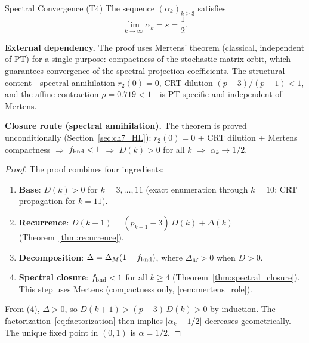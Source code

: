 \documentclass[12pt,a4paper]{article}
\begin{document}
\begin{thmbox}{Spectral Convergence (T4)}
\label{thm:T4}
The sequence $(\alpha_k)_{k \geq 3}$ satisfies
\begin{equation}
  \lim_{k \to \infty} \alpha_k = s = \frac{1}{2}.
  \label{eq:T4}
\end{equation}

\textbf{External dependency.}
The proof uses Mertens' theorem (classical, independent of PT)
for a single purpose: compactness of the stochastic matrix orbit,
which guarantees convergence of the spectral projection coefficients.
The structural content---spectral annihilation $r_2(0) = 0$,
CRT dilution $(p{-}3)/(p{-}1) < 1$, and the affine contraction
$\rho = 0.719 < 1$---is PT-specific and independent of Mertens.

\textbf{Closure route (spectral annihilation).}
The theorem is proved unconditionally (Section~\ref{sec:ch7_HL}):
$r_2(0) = 0$ +
CRT dilution + Mertens compactness $\Rightarrow$ $f_{\rm bnd} < 1$
$\Rightarrow$ $D(k) > 0$ for all $k$ $\Rightarrow$ $\alpha_k \to 1/2$.

\begin{proof}
The proof combines four ingredients:
\begin{enumerate}[nosep]
\item \textbf{Base}: $D(k) > 0$ for $k = 3,\ldots,11$ (exact enumeration
  through $k = 10$; CRT propagation for $k = 11$).
\item \textbf{Recurrence}: $D(k+1) = (p_{k+1}-3)\,D(k) + \Delta(k)$
  (Theorem~\ref{thm:recurrence}).
\item \textbf{Decomposition}: $\Delta = \Delta_M(1 - f_{\rm bnd})$,
  where $\Delta_M > 0$ when $D > 0$.
\item \textbf{Spectral closure}: $f_{\rm bnd} < 1$ for all $k \geq 4$
  (Theorem~\ref{thm:spectral_closure}).  This step uses Mertens
  (compactness only, \cref{rem:mertens_role}).
\end{enumerate}
From (4), $\Delta > 0$, so $D(k+1) > (p-3)\,D(k) > 0$ by induction.
The factorization~\eqref{eq:factorization} then implies
$|\alpha_k - 1/2|$ decreases geometrically. The unique fixed point
in $(0,1)$ is $\alpha = 1/2$.
\end{proof}
\end{thmbox}
\end{document}
